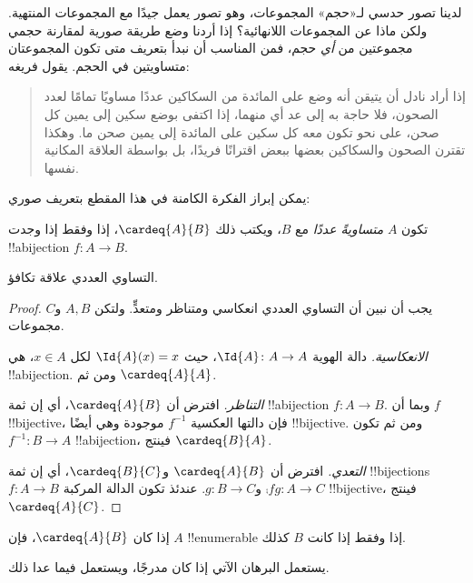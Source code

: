\documentclass[../../../include/open-logic-section]{subfiles}
\begin{document}


لدينا تصور حدسي لـ«حجم» المجموعات، وهو تصور يعمل جيدًا مع المجموعات
المنتهية. ولكن ماذا عن المجموعات اللانهائية؟ إذا أردنا وضع طريقة صورية
لمقارنة حجمي مجموعتين من \emph{أي} حجم، فمن المناسب أن نبدأ بتعريف
متى تكون المجموعتان متساويتين في الحجم. يقول فريغه:
\begin{quote}
  إذا أراد نادل أن يتيقن أنه وضع على المائدة من السكاكين عددًا مساويًا
  تمامًا لعدد الصحون، فلا حاجة به إلى عد أي منهما، إذا اكتفى بوضع سكين
  إلى يمين كل صحن، على نحو تكون معه كل سكين على المائدة إلى يمين صحن
  ما. وهكذا تقترن الصحون والسكاكين بعضها ببعض اقترانًا فريدًا، بل بواسطة
  العلاقة المكانية نفسها. \citep[\S70]{Frege1884}
\end{quote}
يمكن إبراز الفكرة الكامنة في هذا المقطع بتعريف صوري:

\begin{defn}
  تكون $A$ \emph{متساويةً عددًا} مع $B$، ويكتب ذلك $\cardeq{A}{B}$، إذا
  وفقط إذا وجدت !!a{bijection} $f \colon A \to B$.
\end{defn}

\begin{prop}
التساوي العددي علاقة تكافؤ.
\end{prop}

\begin{proof}
يجب أن نبين أن التساوي العددي انعكاسي ومتناظر ومتعدٍّ. ولتكن $A, B$
و$C$ مجموعات.

\emph{الانعكاسية.} دالة الهوية $\Id{A} \colon A \to A$، حيث
$\Id{A} (x) = x$ لكل $x \in A$، هي !!a{bijection}. ومن ثم
$\cardeq{A}{A}$.

\emph{التناظر.} افترض أن $\cardeq{A}{B}$، أي إن ثمة
!!a{bijection} $f\colon A \to B$. وبما أن $f$ !!{bijective}، فإن
دالتها العكسية $f^{-1}$ موجودة وهي أيضًا !!{bijective}. ومن ثم تكون
$f^{-1}\colon B \to A$ !!a{bijection}، فينتج $\cardeq{B}{A}$.

\emph{التعدي.} افترض أن $\cardeq{A}{B}$ و$\cardeq{B}{C}$، أي إن ثمة
!!{bijection}s $f\colon A \to B$ و$g\colon B \to
C$. عندئذ تكون الدالة المركبة $\comp{f}{g}\colon A \to C$ !!{bijective}،
فينتج $\cardeq{A}{C}$.
\end{proof}

\begin{prop}
إذا كان $\cardeq{A}{B}$، فإن $A$ !!{enumerable} إذا
وفقط إذا كانت $B$ كذلك.
\end{prop}

\begin{editorial}
يستعمل البرهان الآتي  إذا كان
 مدرجًا، ويستعمل 
فيما عدا ذلك.
\end{editorial}
\end{document}
